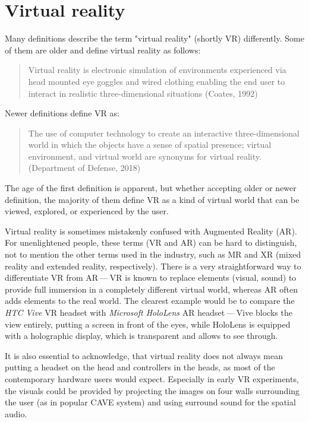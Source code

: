 \chapter{Virtual reality}

Many definitions describe the term "virtual reality" (shortly VR) differently.
Some of them are older and define virtual reality as follows:

\begin{quotation}
Virtual reality is electronic simulation of environments experienced via
head mounted eye goggles and wired clothing enabling the end user to interact
in realistic three-dimensional situations (Coates, 1992)
\end{quotation}

Newer definitions define VR as:

\begin{quotation}
The use of computer technology to create an interactive three-dimensional
world in which the objects have a sense of spatial presence;
virtual environment, and virtual world are synonyms for virtual reality.
(Department of Defense, 2018)
\end{quotation}

The age of the first definition is apparent, but whether accepting older or newer
definition, the majority of them define VR as a kind of
virtual world that can be viewed, explored, or experienced by the user.

Virtual reality is sometimes mistakenly confused with Augmented Reality (AR).
For unenlightened people, these terms (VR and AR) can be hard to distinguish,
not to mention the other terms used in the industry, such as MR and XR
(mixed reality and extended reality, respectively). There is a very straightforward
way to differentiate VR from AR — VR is known to replace elements
(visual, sound) to provide full immersion in a completely different virtual
world, whereas AR often adds elements to the real world\cite{vrar}.
The clearest example would be to compare the \emph{HTC Vive} VR headset with
\emph{Microsoft HoloLens} AR headset — Vive blocks the view entirely, putting
a screen in front of the eyes, while HoloLens is equipped with a holographic
display, which is transparent and allows to see through.

It is also essential to acknowledge, that virtual reality does not always mean
putting a headset on the head and controllers in the heads, as most of the
contemporary hardware users would expect. Especially in
early VR experiments, the visuals could be provided by projecting the images
on four walls surrounding the user (as in popular CAVE system\cite{cave}) and
using surround sound for the spatial audio.

